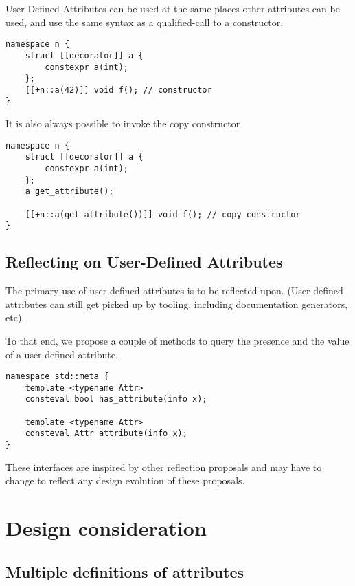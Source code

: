 \documentclass{wg21}
\begin{document}
User-Defined Attributes can be used at the same places other attributes can be used,
and use the same syntax as a qualified-call to a constructor.

\begin{verbatim}
namespace n {
    struct [[decorator]] a {
        constexpr a(int);
    };
    [[+n::a(42)]] void f(); // constructor
}
\end{verbatim}

It is also always possible to invoke the copy constructor


\begin{verbatim}
namespace n {
    struct [[decorator]] a {
        constexpr a(int);
    };
    a get_attribute();
    
    [[+n::a(get_attribute())]] void f(); // copy constructor
}
\end{verbatim}


\subsection{Reflecting on User-Defined Attributes}

The primary use of user defined attributes is to be reflected upon.
(User defined attributes can still get picked up by tooling, including documentation generators, etc).

To that end, we propose a couple of methods to query the presence and the value of a user defined attribute.

\begin{verbatim}
namespace std::meta {
    template <typename Attr>
    consteval bool has_attribute(info x);
    
    template <typename Attr>
    consteval Attr attribute(info x);
}

\end{verbatim}

\begin{note}
These interfaces are inspired by other reflection proposals and may have to change to reflect any design evolution of these proposals.
\end{note}


\section{Design consideration}

\subsection{Multiple definitions of attributes}
\end{document}
